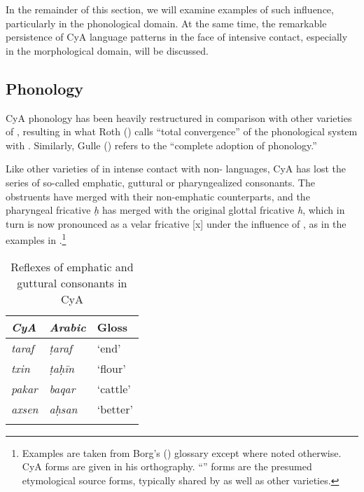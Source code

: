 \documentclass[output=paper]{langsci/langscibook}
\begin{document}
In the remainder of this section, we will examine examples of such  influence, particularly in the phonological domain. At the same time, the remarkable persistence of CyA language patterns in the face of {intensive} contact, especially in the morphological domain, will be discussed.

\subsection{Phonology}


CyA phonology has been heavily restructured in comparison with other varieties of , resulting in what Roth (\citeyear[55]{Roth2004}) calls “total {convergence}” of the phonological system with . Similarly, Gulle (\citeyear[47]{Gulle2016}) refers to the “complete adoption of  phonology.”

Like other varieties of  in intense contact with non- languages, CyA has lost the series of so-called {emphatic}, guttural or {pharyngealized} consonants. The obstruents have {merged} with their non-{emphatic} counterparts, and the {pharyngeal} fricative \textit{ḥ} has {merged} with the original glottal fricative \textit{h}, which in turn is now pronounced as a velar fricative [x] under the influence of , as in the examples in .\footnote{Examples are taken from Borg's (\citeyear{Borg2004}) glossary except where noted otherwise. CyA forms are given in his {orthography}. “” forms are the presumed etymological source forms, typically shared by   as well as other varieties.}


\begin{table}
\begin{tabular}{>{\itshape}l>{\itshape}ll}
\lsptoprule
{\normalfont CyA} & {\normalfont Arabic} & {Gloss}\\\midrule
taraf & ṭaraf & ‘end’\\
txin & ṭaḥīn & ‘flour’\\
pakar & baqar & ‘cattle’\\
axsen & aḥsan & ‘better’\\
\lspbottomrule
\end{tabular}
\caption{\label{bkm:Ref13774757}Reflexes of emphatic and guttural consonants in CyA\label{tab:walter:1}}
\end{table}
\end{document}

